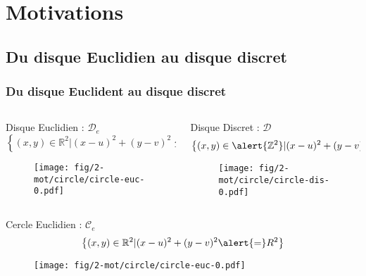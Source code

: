 \section{Motivations}

\subsection{Du disque Euclidien au disque discret}


\begin{frame}
\frametitle{Du disque Euclident au disque discret}
{
  \begin{columns}[t]
    \begin{column}{0.5\linewidth}
      \begin{block}{Disque Euclidien : $\mathcal{D}_e$}
        $$\left\{ (x,y) \in \mathbb{R}^{2} | (x - u)^2 + (y - v)^2 \leq R^2 \right\}$$
        \begin{figure}[h!]
          \centering
          \texttt{[image: fig/2-mot/circle/circle-euc-0.pdf]}
        \end{figure}
      \end{block}
    
    \end{column}
    \begin{column}{0.5\linewidth}
      \begin{block}{Disque Discret : $\mathcal{D}$}
        $$\left\{ (x,y) \in \alert{\mathbb{Z}^{2}} | (x - u)^2 + (y - v)^2 \leq R^2 \right\}$$

        \begin{figure}[h!]
          \centering
          \texttt{[image: fig/2-mot/circle/circle-dis-0.pdf]}
        \end{figure}
      \end{block}  
    \end{column}
  \end{columns} 
}
        
{
  \begin{columns}[t]
    \begin{column}{0.5\linewidth}
      \begin{block}{Cercle Euclidien : $\mathcal{C}_e$}
        $$\left\{ (x,y) \in \mathbb{R}^{2} | (x - u)^2 + (y - v)^2 \alert{=} R^2 \right\}$$
        \begin{figure}[h!]
          \centering
          \texttt{[image: fig/2-mot/circle/circle-euc-0.pdf]}
        \end{figure}
      \end{block}
    

\end{column}
\end{columns}}
\end{frame}
